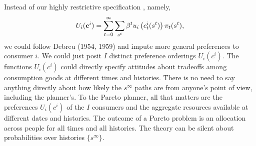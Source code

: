 %
 Instead of our highly restrictive specification  %
 , namely,
 $$U_i({\bf c}^i) =
  \sum_{t=0}^\infty \sum_{s^t} \beta^t u_i\left(c_t^i(s^t)\right)
   \pi_t(s^t),$$
we could follow
  Debreu (1954, 1959)  and impute  more  general preferences to
consumer $i$.    We %
could just posit $I$  distinct   preference orderings   $U_i(c^i)$.
The functions
$U_i(c^i)$ could   directly specify attitudes about  tradeoffs among consumption goods at different times and histories.
There is no need to say anything directly about how likely the $s^\infty$ paths are from  anyone's  point of view, including the planner's.
To the Pareto planner, all that matters are  the preferences $U_i(c^i)$ of the $I$ consumers and the aggregate resources available at different dates and histories.
The outcome of a Pareto problem is an allocation  across people
for all times and all histories.  %
The theory   can be silent about probabilities over histories $\{s^\infty\}$.



